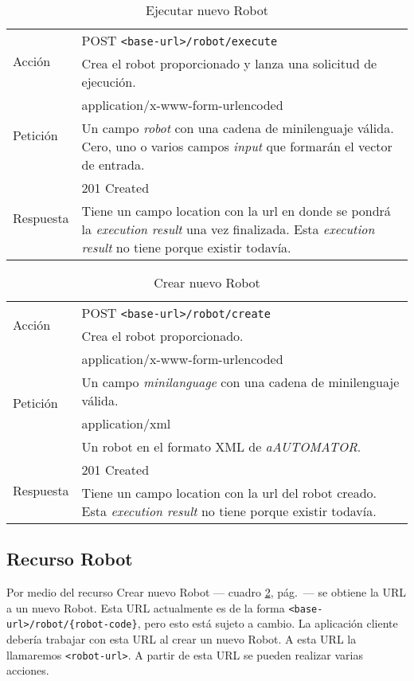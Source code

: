\begin{table}[hp]
\begin{tabularx}{\textwidth}{l X}
\multirow{2}{*}{Acción}
 & POST \verb+<base-url>/robot/execute+ \\
 & Crea el robot proporcionado y lanza una solicitud de
ejecución.\\ \hline
\multirow{2}{*}{Petición}
 & application/x-www-form-urlencoded \\
 & Un campo \emph{robot} con una cadena de
  minilenguaje válida. \newline
  Cero, uno o varios campos \emph{input} que formarán el vector de
  entrada.\\ \hline
\multirow{2}{*}{Respuesta}
& 201 Created \\
& Tiene un campo location con la url en donde se pondrá la \emph{execution result}
una vez finalizada.
Esta \emph{execution result} no tiene porque existir todavía.\\
\end{tabularx}
\caption{Ejecutar nuevo Robot}
\label{execute_new_robot}
\end{table}

\begin{table}[hp]
\begin{tabularx}{\textwidth}{l X}
\multirow{2}{*}{Acción}
 & POST \verb+<base-url>/robot/create+ \\
 & Crea el robot proporcionado.\\ \hline
\multirow{4}{*}{Petición}
 & application/x-www-form-urlencoded \\
 & Un campo \emph{minilanguage} con una cadena de
  minilenguaje válida.\\ \cline{2-2}
 & application/xml \\
 & Un robot en el formato XML de \emph{aAUTOMATOR}.\\ \hline
\multirow{2}{*}{Respuesta}
& 201 Created \\
& Tiene un campo location con la url del robot creado.
Esta \emph{execution result} no tiene porque existir todavía.\\
\end{tabularx}
\caption{Crear nuevo Robot}
\label{create_new_robot}
\end{table}
\newpage

\subsection{Recurso Robot}

Por medio del recurso Crear nuevo Robot --- cuadro
\ref{create_new_robot}, pág.~\pageref{create_new_robot}--- se obtiene
la URL a un nuevo Robot. Esta URL actualmente es de la forma
\verb+<base-url>/robot/{robot-code}+, pero esto está sujeto a
cambio. La aplicación cliente debería trabajar con esta URL al crear
un nuevo Robot. A esta URL la llamaremos \verb+<robot-url>+. A partir
de esta URL se pueden realizar varias acciones.

